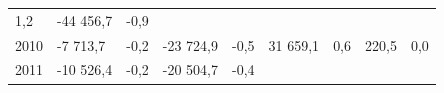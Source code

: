 \begin{longtable}[]{@{}lllllllll@{}}
\begin{minipage}[t]{0.06\columnwidth}
1,2\strut
\end{minipage} & \begin{minipage}[t]{0.08\columnwidth}\raggedright
-44 456,7\strut
\end{minipage} & \begin{minipage}[t]{0.06\columnwidth}\raggedright
-0,9\strut
\end{minipage}\tabularnewline
\begin{minipage}[t]{0.05\columnwidth}\raggedright
2010\strut
\end{minipage} & \begin{minipage}[t]{0.10\columnwidth}\raggedright
-7 713,7\strut
\end{minipage} & \begin{minipage}[t]{0.06\columnwidth}\raggedright
-0,2\strut
\end{minipage} & \begin{minipage}[t]{0.17\columnwidth}\raggedright
-23 724,9\strut
\end{minipage} & \begin{minipage}[t]{0.06\columnwidth}\raggedright
-0,5\strut
\end{minipage} & \begin{minipage}[t]{0.12\columnwidth}\raggedright
31 659,1\strut
\end{minipage} & \begin{minipage}[t]{0.06\columnwidth}\raggedright
0,6\strut
\end{minipage} & \begin{minipage}[t]{0.08\columnwidth}\raggedright
220,5\strut
\end{minipage} & \begin{minipage}[t]{0.06\columnwidth}\raggedright
0,0\strut
\end{minipage}\tabularnewline
\begin{minipage}[t]{0.05\columnwidth}\raggedright
2011\strut
\end{minipage} & \begin{minipage}[t]{0.10\columnwidth}\raggedright
-10 526,4\strut
\end{minipage} & \begin{minipage}[t]{0.06\columnwidth}\raggedright
-0,2\strut
\end{minipage} & \begin{minipage}[t]{0.17\columnwidth}\raggedright
-20 504,7\strut
\end{minipage} & \begin{minipage}[t]{0.06\columnwidth}\raggedright
-0,4\strut
\end{minipage} & \begin{minipage}[t]{0.12\columnwidth}\raggedright

\end{minipage}
\end{longtable}
